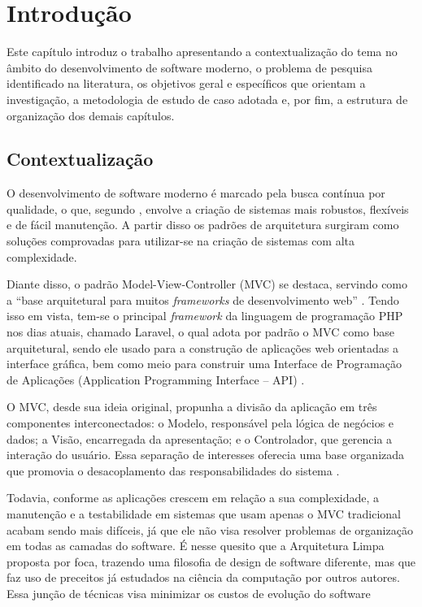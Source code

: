 \chapter{Introdução}
\thispagestyle{headings}
    \par Este capítulo introduz o trabalho apresentando a contextualização do tema no âmbito do desenvolvimento de software moderno, o problema de pesquisa identificado na literatura, os objetivos geral e específicos que orientam a investigação, a metodologia de estudo de caso adotada e, por fim, a estrutura de organização dos demais capítulos.
    
    \section{Contextualização}
        \par O desenvolvimento de software moderno é marcado pela busca contínua por qualidade, o que, segundo \cite{livro:pressman:engenharia:2021}, envolve a criação de sistemas mais robustos, flexíveis e de fácil manutenção. A partir disso os padrões de arquitetura surgiram como soluções comprovadas para utilizar-se na criação de sistemas com alta complexidade. 
        
        
        \par Diante disso, o padrão Model-View-Controller (MVC) se destaca, servindo como a ``base arquitetural para muitos \textit{frameworks} de desenvolvimento web'' \cite{inproceedings:grove:2011}. Tendo isso em vista, tem-se o principal \textit{framework} da linguagem de programação PHP nos dias atuais, chamado Laravel, o qual adota por padrão o MVC como base arquitetural, sendo ele usado para a construção de aplicações web orientadas a interface gráfica, bem como meio para construir uma Interface de Programação de Aplicações (Application Programming Interface – API) \cite{laravel:docs}.
        
        \par O MVC, desde sua ideia original, propunha a divisão da aplicação em três componentes interconectados: o Modelo, responsável pela lógica de negócios e dados; a Visão, encarregada da apresentação; e o Controlador, que gerencia a interação do usuário. Essa separação de interesses oferecia uma base organizada que promovia o desacoplamento das responsabilidades do sistema \cite{artigo:reenskaug:1979}.
        
        \par Todavia, conforme as aplicações crescem em relação a sua complexidade, a manutenção e a testabilidade em sistemas que usam apenas o MVC tradicional acabam sendo mais difíceis, já que ele não visa resolver problemas de organização em todas as camadas do software. É nesse quesito que a Arquitetura Limpa proposta por \cite{livro:martin:cleanarch} foca, trazendo uma filosofia de design de software diferente, mas que faz uso de preceitos já estudados na ciência da computação por outros autores. Essa junção de técnicas visa minimizar os custos de evolução do software \cite{livro:martin:cleanarch}
        

